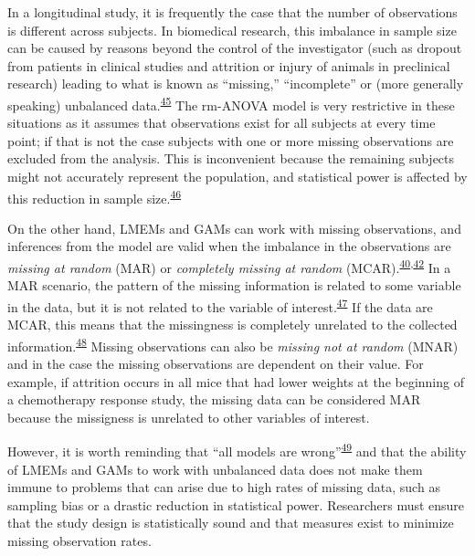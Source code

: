 \documentclass[
]{article}
\begin{document}
In a longitudinal study, it is frequently the case that the number of observations is different across subjects. In biomedical research, this imbalance in sample size can be caused by reasons beyond the control of the investigator (such as dropout from patients in clinical studies and attrition or injury of animals in preclinical research) leading to what is known as ``missing,'' ``incomplete'' or (more generally speaking) unbalanced data.\textsuperscript{\protect\hyperlink{ref-molenberghs2004}{45}} The rm-ANOVA model is very restrictive in these situations as it assumes that observations exist for all subjects at every time point; if that is not the case subjects with one or more missing observations are excluded from the analysis. This is inconvenient because the remaining subjects might not accurately represent the population, and statistical power is affected by this reduction in sample size.\textsuperscript{\protect\hyperlink{ref-ma2012}{46}}

On the other hand, LMEMs and GAMs can work with missing observations, and inferences from the model are valid when the imbalance in the observations are \emph{missing at random} (MAR) or \emph{completely missing at random} (MCAR).\textsuperscript{\protect\hyperlink{ref-west2014}{40},\protect\hyperlink{ref-weiss2005}{42}} In a MAR scenario, the pattern of the missing information is related to some variable in the data, but it is not related to the variable of interest.\textsuperscript{\protect\hyperlink{ref-scheffer2002}{47}} If the data are MCAR, this means that the missingness is completely unrelated to the collected information.\textsuperscript{\protect\hyperlink{ref-potthoff2006}{48}} Missing observations can also be \emph{missing not at random} (MNAR) and in the case the missing observations are dependent on their value. For example, if attrition occurs in all mice that had lower weights at the beginning of a chemotherapy response study, the missing data can be considered MAR because the missigness is unrelated to other variables of interest.

However, it is worth reminding that ``all models are wrong''\textsuperscript{\protect\hyperlink{ref-box1976}{49}} and that the ability of LMEMs and GAMs to work with unbalanced data does not make them immune to problems that can arise due to high rates of missing data, such as sampling bias or a drastic reduction in statistical power. Researchers must ensure that the study design is statistically sound and that measures exist to minimize missing observation rates.
\end{document}
